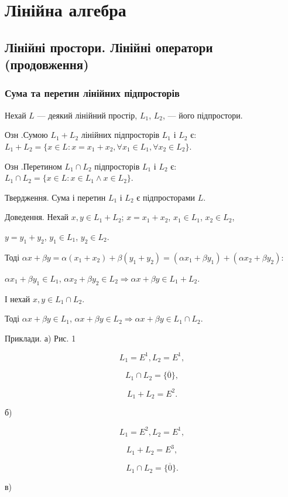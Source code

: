 \chapter{Лінійна алгебра}


\section{Лінійні простори. Лінійні оператори (продовження)}

\subsection*{Сума та перетин лінійних підпросторів}

Нехай $L$ --- деякий лінійний простір, $L_1$, $L_2$, --- його підпростори.

Озн .Сумою $L_1 + L_2$ лінійних підпросторів $L_1$ і $L_2$ є:
$L_1 + L_2 = \{ x \in L: x = x_1 + x_2, \forall x_1 \in L_1, \forall x_2 \in L_2\}$.


Озн .Перетином $L_1 \cap L_2$ підпросторів $L_1$ і $L_2$ є:
$L_1 \cap L_2 = \{x \in L: x \in L_1 \wedge x \in L_2 \}$.


Твердження. Сума і перетин $L_1$ і $L_2$ є підпросторами $L$.


Доведення. Нехай $x,y \in L_1 + L_2$; $x = x_1 + x_2$, $x_1 \in L_1$, $x_2 \in L_2$,

$y = y_1 + y_2$, $y_1 \in L_1$, $y_2 \in L_2$.

Тоді $\alpha x + \beta y = \alpha(x_1 + x_2) + \beta(y_1 + y_2) = (\alpha x_1 + \beta y_1) + (\alpha x_2 + \beta y_2):$

$\alpha x_1 + \beta y_1 \in L_1$, $\alpha x_2 + \beta y_2 \in L_2 \Rightarrow \alpha x + \beta y \in L_1 + L_2.$

І нехай $x,y \in L_1 \cap L_2$.

Тоді $\alpha x + \beta y \in L_1$, $\alpha x + \beta y \in L_2 \Rightarrow \alpha x + \beta y \in L_1 \cap L_2$.


Приклади.
а)
Рис. 1

$$L_1 = E^1, L_2 = E^1,$$

$$L_1 \cap L_2 = \{\overline{0}\},$$

$$L_1 + L_2 = E^2.$$


б)

$$L_1 = E^2, L_2 = E^1,$$

$$L_1 + L_2 = E^3,$$

$$L_1 \cap L_2 = \{\overline{0}\}.$$


в)

